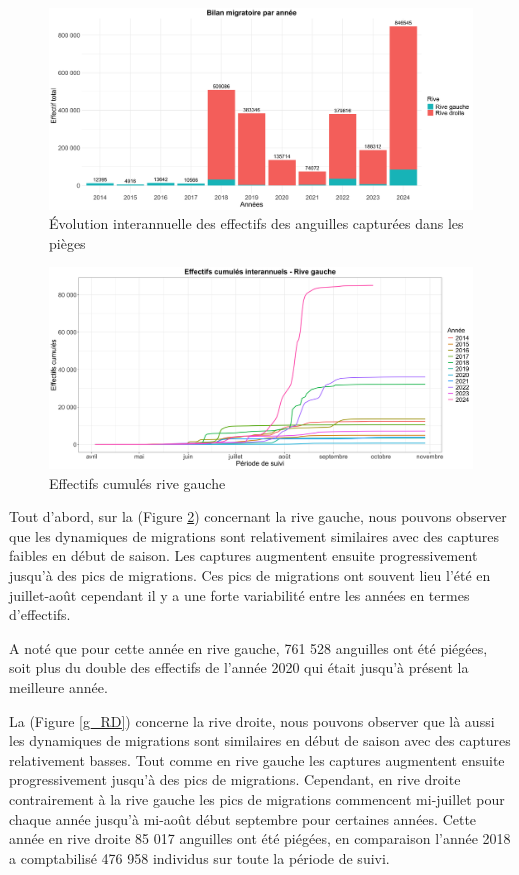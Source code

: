 \documentclass[11pt,titlepage,twoside]{article}\usepackage[]{graphicx}\usepackage[table]{xcolor}
\begin{document}
\begin{figure}[htpb]
\centering
\includegraphics[width=\textwidth]{graph_annee_oral.png}
\caption{Évolution interannuelle des effectifs des anguilles capturées dans les pièges}
\label{graph_annee_oral}
\end{figure}

\begin{figure}[htpb]
\centering
\includegraphics[width=\textwidth]{g_RG.png}
\caption{Effectifs cumulés rive gauche}
\label{g_RG}
\end{figure}

Tout d’abord, sur la (Figure \ref{g_RG}) concernant la rive gauche, nous pouvons observer que les dynamiques de migrations sont relativement similaires avec des captures faibles en début de saison. Les captures augmentent ensuite progressivement jusqu’à des pics de migrations.   Ces pics de migrations ont souvent lieu l’été en juillet-août cependant il y a une forte variabilité entre les années en termes d’effectifs.

A noté que pour cette année en rive gauche, 761 528 anguilles ont été piégées, soit plus du double des effectifs de l’année 2020 qui était jusqu’à présent la meilleure année.


La (Figure \ref{g_RD}) concerne la rive droite, nous pouvons observer que là aussi les dynamiques de migrations sont similaires en début de saison avec des captures relativement basses. Tout comme en rive gauche les captures augmentent ensuite progressivement jusqu’à des pics de migrations. Cependant, en rive droite contrairement à la rive gauche les pics de migrations commencent mi-juillet pour chaque année jusqu’à mi-août début septembre pour certaines années. Cette année en rive droite 85 017 anguilles ont été piégées, en comparaison l’année 2018 a comptabilisé 476 958 individus sur toute la période de suivi.
\end{document}
